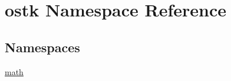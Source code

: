\hypertarget{namespaceostk}{}\section{ostk Namespace Reference}
\label{namespaceostk}
\subsection*{Namespaces}
\begin{DoxyCompactItemize}
\item 
 \hyperlink{namespaceostk_1_1math}{math}
\end{DoxyCompactItemize}
